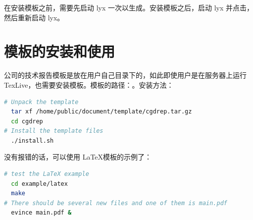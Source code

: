在安装模板之前，需要先启动 lyx 一次以生成。安装模板之后，启动 lyx 并点击，然后重新启动 lyx。

\section{模板的安装和使用}
公司的技术报告模板是放在用户自己目录下的，如此即使用户是在服务器上运行 TexLive，也需要安装模板。模板的路径：。安装方法：
\begin{lstlisting}[language=sh,caption={安装模板}]
# Unpack the template
  tar xf /home/public/document/template/cgdrep.tar.gz
  cd cgdrep
# Install the template files
  ./install.sh
\end{lstlisting}

没有报错的话，可以使用 \LaTeX 模板的示例了：
\begin{lstlisting}[language=sh,caption={模板示例}]
# test the LaTeX example
  cd example/latex
  make
# There should be several new files and one of them is main.pdf
  evince main.pdf &
\end{lstlisting}
